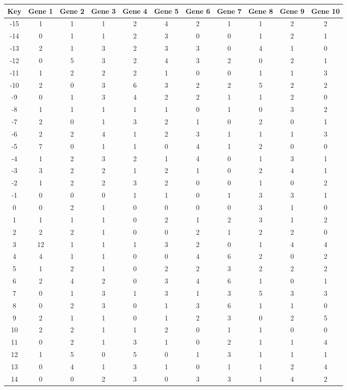 \begin{tabular}{|c|c|c|c|c|c|c|c|c|c|c|}
\hline
Key & Gene 1 & Gene 2 & Gene 3 & Gene 4 & Gene 5 & Gene 6 & Gene 7 & Gene 8 & Gene 9 & Gene 10 \\
\hline
-15 & 1 & 1 & 1 & 2 & 4 & 2 & 1 & 1 & 2 & 2 \\
-14 & 0 & 1 & 1 & 2 & 3 & 0 & 0 & 1 & 2 & 1 \\
-13 & 2 & 1 & 3 & 2 & 3 & 3 & 0 & 4 & 1 & 0 \\
-12 & 0 & 5 & 3 & 2 & 4 & 3 & 2 & 0 & 2 & 1 \\
-11 & 1 & 2 & 2 & 2 & 1 & 0 & 0 & 1 & 1 & 3 \\
-10 & 2 & 0 & 3 & 6 & 3 & 2 & 2 & 5 & 2 & 2 \\
-9 & 0 & 1 & 3 & 4 & 2 & 2 & 1 & 1 & 2 & 0 \\
-8 & 1 & 1 & 1 & 1 & 1 & 0 & 1 & 0 & 3 & 2 \\
-7 & 2 & 0 & 1 & 3 & 2 & 1 & 0 & 2 & 0 & 1 \\
-6 & 2 & 2 & 4 & 1 & 2 & 3 & 1 & 1 & 1 & 3 \\
-5 & 7 & 0 & 1 & 1 & 0 & 4 & 1 & 2 & 0 & 0 \\
-4 & 1 & 2 & 3 & 2 & 1 & 4 & 0 & 1 & 3 & 1 \\
-3 & 3 & 2 & 2 & 1 & 2 & 1 & 0 & 2 & 4 & 1 \\
-2 & 1 & 2 & 2 & 3 & 2 & 0 & 0 & 1 & 0 & 2 \\
-1 & 0 & 0 & 0 & 1 & 1 & 0 & 1 & 3 & 3 & 1 \\
0 & 0 & 2 & 1 & 0 & 0 & 0 & 0 & 3 & 1 & 0 \\
1 & 1 & 1 & 1 & 0 & 2 & 1 & 2 & 3 & 1 & 2 \\
2 & 2 & 2 & 1 & 0 & 0 & 2 & 1 & 2 & 2 & 0 \\
3 & 12 & 1 & 1 & 1 & 3 & 2 & 0 & 1 & 4 & 4 \\
4 & 4 & 1 & 1 & 0 & 0 & 4 & 6 & 2 & 0 & 2 \\
5 & 1 & 2 & 1 & 0 & 2 & 2 & 3 & 2 & 2 & 2 \\
6 & 2 & 4 & 2 & 0 & 3 & 4 & 6 & 1 & 0 & 1 \\
7 & 0 & 1 & 3 & 1 & 3 & 1 & 3 & 5 & 3 & 3 \\
8 & 0 & 2 & 3 & 0 & 1 & 3 & 6 & 1 & 1 & 0 \\
9 & 2 & 1 & 1 & 0 & 1 & 2 & 3 & 0 & 2 & 5 \\
10 & 2 & 2 & 1 & 1 & 2 & 0 & 1 & 1 & 0 & 0 \\
11 & 0 & 2 & 1 & 3 & 1 & 0 & 2 & 1 & 1 & 4 \\
12 & 1 & 5 & 0 & 5 & 0 & 1 & 3 & 1 & 1 & 1 \\
13 & 0 & 4 & 1 & 3 & 1 & 0 & 1 & 1 & 2 & 4 \\
14 & 0 & 0 & 2 & 3 & 0 & 3 & 3 & 1 & 4 & 2 \\
\hline
\end{tabular}